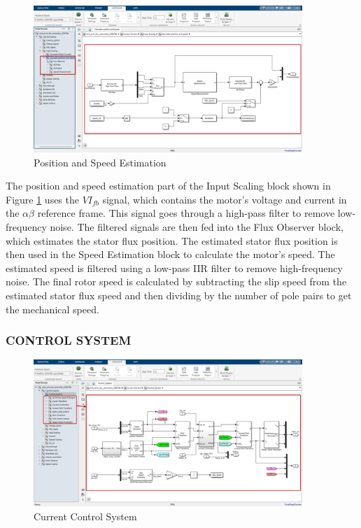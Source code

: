 \begin{figure}[H]
	\centering
	\includegraphics[width=4in]{sections/section3/images/simulation/inputScaling/fluxObserver.png}
	\caption{Position and Speed Estimation}
	\label{fig:position_speed_estimation}
\end{figure}


The position and speed estimation part of the Input Scaling block shown in  Figure \ref{fig:position_speed_estimation} uses the $VI_{fb}$ signal, which contains the motor's voltage and current in the $\alpha \beta$ reference frame. This signal goes through a high-pass filter to remove low-frequency noise. The filtered signals are then fed into the Flux Observer block, which estimates the stator flux position. The estimated stator flux position is then used in the Speed Estimation block to calculate the motor's speed. The estimated speed is filtered using a low-pass IIR filter to remove high-frequency noise. The final rotor speed is calculated by subtracting the slip speed from the estimated stator flux speed and then dividing by the number of pole pairs to get the mechanical speed.

\subsubsection{CONTROL SYSTEM}



\begin{figure}[H]
	\centering
	\includegraphics[width=4in]{sections/section3/images/simulation/currentControl/controlSystem.png}
	\caption{Current Control System}
	\label{fig:current_control_system}
\end{figure}


